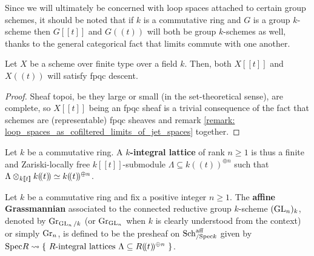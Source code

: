             \begin{remark} \label{remark: loop_groups}
                Since we will ultimately be concerned with loop spaces attached to certain group schemes, it should be noted that if $k$ is a commutative ring and $G$ is a group $k$-scheme then $G[\![t]\!]$ and $G(\!(t)\!)$ will both be group $k$-schemes as well, thanks to the general categorical fact that limits commute with one another.
            \end{remark}
            \begin{proposition} \label{prop: loop_spaces_are_fpqc_sheaves}
                Let $X$ be a scheme over finite type over a field $k$. Then, both $X[\![t]\!]$ and $X(\!(t)\!)$ will satisfy fpqc descent. 
            \end{proposition}
                \begin{proof}
                    Sheaf topoi, be they large or small (in the set-theoretical sense), are complete, so $X[\![t]\!]$ being an fpqc sheaf is a trivial consequence of the fact that schemes are (representable) fpqc sheaves and remark \ref{remark: loop_spaces_as_cofiltered_limits_of_jet_spaces} together.
                \end{proof}
            
            \begin{definition} \label{def: integral_lattices}
                Let $k$ be a commutative ring. A \textbf{$k$-integral lattice} of rank $n \geq 1$ is thus a finite and Zariski-locally free $k[\![t]\!]$-submodule $\Lambda \subseteq k(\!(t)\!)^{\oplus n}$ such that $\Lambda \tensor_{k[\![t]\!]} k(\!(t)\!) \cong k(\!(t)\!)^{\oplus n}$. 
            \end{definition}
            \begin{definition} \label{def: the_affine_grassmannian_for_GLn}
                Let $k$ be a commutative ring and fix a positive integer $n \geq 1$. The \textbf{affine Grassmannian} associated to the connected reductive group $k$-scheme $(\operatorname{GL}_n)_k$, denoted by $\mathrm{Gr}_{\operatorname{GL}_n/k}$ (or $\mathrm{Gr}_{\operatorname{GL}_n}$ when $k$ is clearly understood from the context) or simply $\mathrm{Gr}_n$, is defined to be the presheaf on $\mathrm{Sch}_{/\mathrm{Spec} k}^{\mathrm{aff}}$ given by $\mathrm{Spec} R \leadsto \left\{ \text{ $R$-integral lattices $\Lambda \subseteq R(\!(t)\!)^{\oplus n}$ } \right\}$.
            \end{definition}
            
